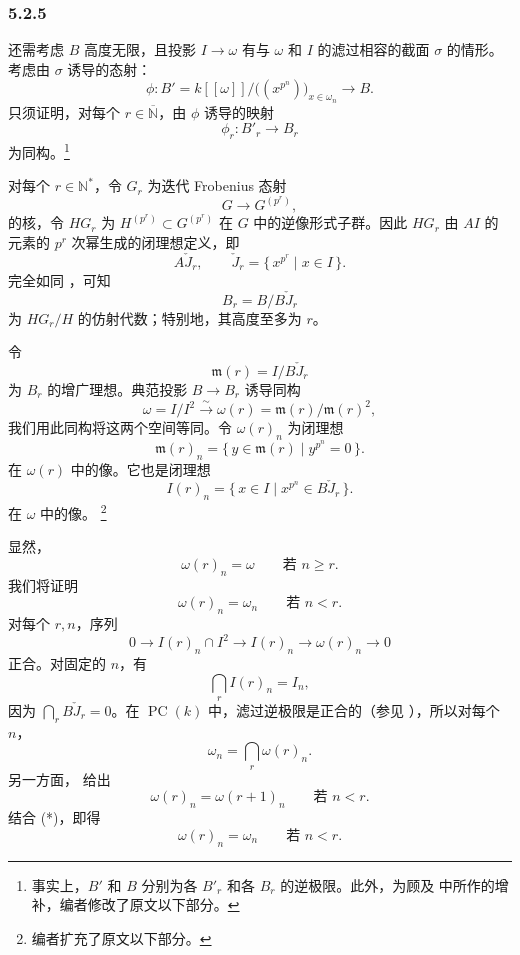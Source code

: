 
\subsubsection*{5.2.5}
\label{sga3:VIIB:5.2.5}

还需考虑 \(B\) 高度无限，且投影 \(I\to\omega\) 有与 \(\omega\) 和 \(I\) 的滤过相容的截面 \(\sigma\) 的情形。考虑由 \(\sigma\) 诱导的态射：
\[
  \phi:
  B'
  =
  k[[\omega]]
  \big/
  \bigl((x^{p^n})\bigr)_{x\in\omega_n}
  \longrightarrow B.
\]
只须证明，对每个 \(r\in\overline{\mathbb N}\)，由 \(\phi\) 诱导的映射
\[
  \phi_r:B'_r\longrightarrow B_r
\]
为同构。\footnote{%
\label{sga3:VIIB:nde:162}事实上，\(B'\) 和 \(B\) 分别为各 \(B'_r\) 和各 \(B_r\) 的逆极限。此外，为顾及  中所作的增补，编者修改了原文以下部分。}

对每个 \(r\in\mathbb N^*\)，令 \(G_r\) 为迭代 Frobenius 态射
\[
  G\longrightarrow G^{(p^r)},
\]
的核，令 \(HG_r\) 为 \(H^{(p^r)}\subset G^{(p^r)}\) 在 \(G\) 中的逆像形式子群。因此 \(HG_r\) 由 \(AI\) 的元素的 \(p^r\) 次幂生成的闭理想定义，即
\[
  A\check J_r,
  \qquad
  \check J_r=\{\,x^{p^r}\mid x\in I\,\}.
\]
完全如同 ，可知
\[
  B_r=B/B\check J_r
\]
为 \(HG_r/H\) 的仿射代数；特别地，其高度至多为 \(r\)。

令
\[
  \mathfrak m(r)=I/B\check J_r
\]
为 \(B_r\) 的增广理想。典范投影 \(B\to B_r\) 诱导同构
\[
  \omega=I/I^2
  \xrightarrow{\ \sim\ }
  \omega(r)
  =
  \mathfrak m(r)/\mathfrak m(r)^2,
\]
我们用此同构将这两个空间等同。令 \(\omega(r)_n\) 为闭理想
\[
  \mathfrak m(r)_n
  =
  \{\,y\in\mathfrak m(r)\mid y^{p^n}=0\,\}.
\]
在 \(\omega(r)\) 中的像。它也是闭理想
\[
  I(r)_n
  =
  \{\,x\in I\mid x^{p^n}\in B\check J_r\,\}.
\]
在 \(\omega\) 中的像。
\footnote{\label{sga3:VIIB:nde:163}编者扩充了原文以下部分。}

显然，
\[
  \omega(r)_n=\omega
  \qquad\text{若 }n\geq r.
\]
我们将证明
\[
  \omega(r)_n=\omega_n
  \qquad\text{若 }n<r.
\]
对每个 \(r,n\)，序列
\[
  0
  \longrightarrow
  I(r)_n\cap I^2
  \longrightarrow
  I(r)_n
  \longrightarrow
  \omega(r)_n
  \longrightarrow0
\]
正合。对固定的 \(n\)，有
\[
  \bigcap_r I(r)_n=I_n,
\]
因为 \(\bigcap_rB\check J_r=0\)。在 \(\operatorname{PC}(k)\) 中，滤过逆极限是正合的\textup{（参见 ）}，所以对每个 \(n\)，
\[
\tag{*}\label{sga3:vii:remark:5-2-4-a:equation:star}
  \omega_n=\bigcap_r\omega(r)_n.
\]
另一方面， 给出
\[
  \omega(r)_n=\omega(r+1)_n
  \qquad\text{若 }n<r.
\]
结合 \textup{(*)}，即得
\[
  \omega(r)_n=\omega_n
  \qquad\text{若 }n<r.
\]


